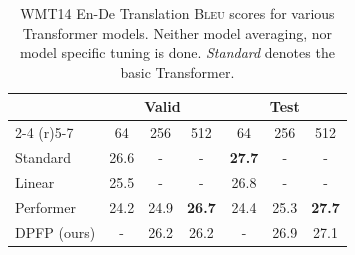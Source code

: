 \documentclass{article}
\theoremstyle{definition}
\begin{document}
\begin{table}[h]
\caption{WMT14 En-De Translation \textsc{Bleu} scores
for various Transformer models.
Neither model averaging, nor model specific tuning is done.
\textit{Standard} denotes the basic Transformer.}
\label{tab:translation}
\vskip 0.15in
\begin{center}
\begin{small}
\begin{tabular}{lcccccc}
\toprule
       & \multicolumn{3}{c}{Valid}  & \multicolumn{3}{c}{Test} \\  \cmidrule(r){2-4}  \cmidrule(r){5-7}
\multicolumn{1}{c}{$d_{\text{dot}}$} & 64 & 256 & 512 & 64 & 256 & 512 \\
\midrule
Standard   & 26.6 & -     & -    & \textbf{27.7}  & - & - \\
Linear    & 25.5 & -     & -    & 26.8  & - & -\\
Performer & 24.2 & 24.9  & \textbf{26.7} & 24.4  & 25.3 & \textbf{27.7} \\
DPFP (ours)   &  -   & 26.2      &  26.2  &  - & 26.9  & 27.1 \\
\bottomrule
\end{tabular}
\end{small}
\end{center}
\vskip -0.1in




\end{table}
\end{document}
